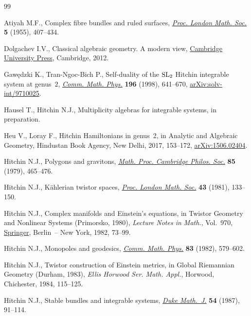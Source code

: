 \documentclass[10pt,a4paper]{amsart}
\numberwithin{equation}{section}
\begin{document}
\begin{thebibliography}{99}
\footnotesize\itemsep=0pt

Atiyah M.F., Complex fibre bundles and ruled surfaces, \href{https://doi.org/10.1112/plms/s3-5.4.407}{\textit{Proc. London
 Math. Soc.}} \textbf{5} (1955), 407--434.

Dolgachev I.V., Classical algebraic geometry. A modern view, \href{https://doi.org/10.1017/CBO9781139084437}{Cambridge
 University Press}, Cambridge, 2012.

Gaw\k{e}dzki K., Tran-Ngoc-Bich P., Self-duality of the {${\rm SL}_2$}
 {H}itchin integrable system at genus~{$2$}, \href{https://doi.org/10.1007/s002200050438}{\textit{Comm. Math. Phys.}}
 \textbf{196} (1998), 641--670, \href{https://arxiv.org/abs/solv-int/9710025}{arXiv:solv-int/9710025}.

Hausel T., Hitchin N.J., Multiplicity algebras for integrable systems, in
 preparation.

Heu V., Loray F., Hitchin {H}amiltonians in genus~2, in Analytic and Algebraic
 Geometry, Hindustan Book Agency, New Delhi, 2017, 153--172,
 \href{https://arxiv.org/abs/1506.02404}{arXiv:1506.02404}.

Hitchin N.J., Polygons and gravitons, \href{https://doi.org/10.1017/S0305004100055924}{\textit{Math. Proc. Cambridge Philos.
 Soc.}} \textbf{85} (1979), 465--476.

Hitchin N.J., K\"ahlerian twistor spaces, \href{https://doi.org/10.1112/plms/s3-43.1.133}{\textit{Proc. London Math. Soc.}}
 \textbf{43} (1981), 133--150.

Hitchin N.J., Complex manifolds and {E}instein's equations, in Twistor Geometry
 and Nonlinear Systems ({P}rimorsko, 1980), \textit{Lecture Notes in Math.},
 Vol.~970, \href{https://doi.org/10.1007/BFb0066025}{Springer}, Berlin~-- New York, 1982, 73--99.

Hitchin N.J., Monopoles and geodesics, \href{https://doi.org/10.1007/BF01208717}{\textit{Comm. Math. Phys.}} \textbf{83}
 (1982), 579--602.

Hitchin N.J., Twistor construction of {E}instein metrics, in Global
 {R}iemannian Geometry ({D}urham, 1983), \textit{Ellis Horwood Ser. Math. Appl.},
 Horwood, Chichester, 1984, 115--125.

Hitchin N.J., Stable bundles and integrable systems, \href{https://doi.org/10.1215/S0012-7094-87-05408-1}{\textit{Duke Math.~J.}}
 \textbf{54} (1987), 91--114.


\end{thebibliography}
\end{document}
